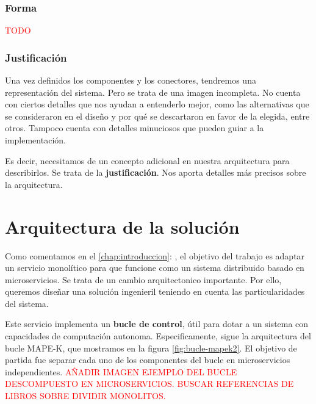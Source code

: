 \subsubsection{Forma}

\textcolor{red}{TODO}

\subsubsection{Justificación}

Una vez definidos los componentes y los conectores, tendremos una representación del sistema. Pero se trata de una imagen incompleta. No cuenta con ciertos detalles que nos ayudan a entenderlo mejor, como las alternativas que se consideraron en el diseño y por qué se descartaron en favor de la elegida, entre otros. Tampoco cuenta con detalles minuciosos que pueden guiar a la implementación.

Es decir, necesitamos de un concepto adicional en nuestra arquitectura para describirlos. Se trata de la \textbf{justificación}. \cite{perryFoundationsStudySoftware1992} Nos aporta detalles más precisos sobre la arquitectura.

\section{Arquitectura de la solución}

Como comentamos en el \autoref{chap:introduccion}: , el objetivo del trabajo es adaptar un servicio monolítico para que funcione como un sistema distribuido basado en microservicios. Se trata de un cambio arquitectonico importante. Por ello, queremos diseñar una solución ingenieril teniendo en cuenta las particularidades del sistema.

Este servicio implementa un \textbf{bucle de control}, útil para dotar a un sistema con capacidades de computación autonoma. Especificamente, sigue la arquitectura del bucle MAPE-K\cite{ArchitecturalBlueprintAutonomic2006,fonsServiciosAdaptivereadyPara2021}, que mostramos en la figura \ref{fig:bucle-mapek2}. El objetivo de partida fue separar cada uno de los componentes del bucle en microservicios independientes.  \textcolor{red}{AÑADIR IMAGEN EJEMPLO DEL BUCLE DESCOMPUESTO EN MICROSERVICIOS. BUSCAR REFERENCIAS DE LIBROS SOBRE DIVIDIR MONOLITOS.}

